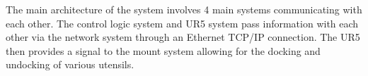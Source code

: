 The main architecture of the system involves 4 main systems communicating with each other. The control logic system and UR5 system pass information with each other via the network system through an Ethernet TCP/IP connection.  The UR5 then provides a signal to the mount system allowing for the docking and undocking of various utensils.